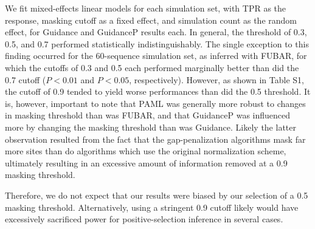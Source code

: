 \documentclass[11pt]{article}
\begin{document}
We fit mixed-effects linear models for each simulation set, with TPR as the response, masking cutoff as a fixed effect, and simulation count as the random effect, for Guidance and GuidanceP results each. In general, the threshold of 0.3, 0.5, and 0.7 performed statistically indistinguishably. The single exception to this finding occurred for the 60-sequence simulation set, as inferred with FUBAR, for which the cutoffs of 0.3 and 0.5 each performed marginally better than did the 0.7 cutoff ($P < 0.01$ and $P < 0.05$, respectively). However, as shown in Table S1, the cutoff of 0.9 tended to yield worse performances than did the 0.5 threshold. It is, however, important to note that PAML was generally more robust to changes in masking threshold than was FUBAR, and that GuidanceP was influenced more by changing the masking threshold than was Guidance. Likely the latter observation resulted from the fact that the gap-penalization algorithms mask far more sites than do algorithms which use the original normalization scheme, ultimately resulting in an excessive amount of information removed at a 0.9 masking threshold.

Therefore, we do not expect that our results were biased by our selection of a 0.5 masking threshold. Alternatively, using a stringent 0.9 cutoff likely would have excessively sacrificed power for positive-selection inference in several cases. 
\end{document}
